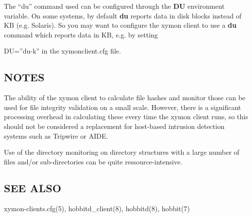   The ``du'' command used can be configured through the \textbf{DU}
 environment variable. On some systems, by default \textbf{du}
 reports data in disk blocks instead of KB (e.g. Solaris). So you may want to configure the xymon client to use a \textbf{du}
 command which reports data in KB, e.g. by setting  
 
DU=''du-k''  
 in the xymonclient.cfg file. 


 
\subsection{NOTES}
 The ability of the xymon client to calculate file hashes and monitor
 those can be used for file integrity validation on a small
 scale. However, there is a significant processing overhead in
 calculating these every time the xymon client runs, so this should
 not be considered a replacement for host-based intrusion detection
 systems such as Tripwire or AIDE. 


  Use of the directory monitoring on directory structures with a large number of files and/or sub-directories can be quite ressource-intensive. 


 
\subsection{SEE ALSO}
xymon-clients.cfg(5), hobbitd\_client(8), hobbitd(8), hobbit(7) 
